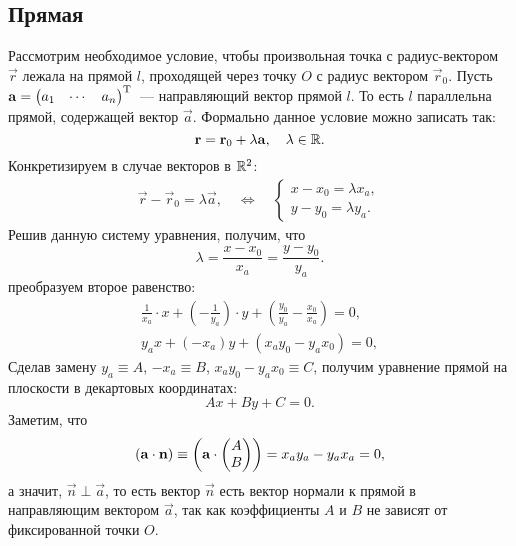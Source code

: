 \subsection{Прямая}

Рассмотрим необходимое условие, чтобы произвольная точка с радиус-вектором $\vec{r}$ лежала на прямой $l$, проходящей через точку $O$ с радиус вектором $\vec{r}_0$. Пусть $ \mathbf{a} = \begin{pmatrix} a_1 & \cdots & a_n\end{pmatrix}^{\operatorname{T}}$~--- направляющий вектор прямой $l$. То есть $l$ параллельна прямой, содержащей вектор $\vec{a}$. Формально данное условие можно записать так:
\begin{equation}
	\mathbf{r} = \mathbf{r}_0 + \lambda \mathbf{a},\quad \lambda \in \mathbb{R}.
\end{equation}
Конкретизируем в случае векторов в $\mathbb{R}^2$:
\begin{gather*}
	\vec{r} - \vec{r}_0 = \lambda \vec{a}, \quad \Longleftrightarrow \quad
	\begin{cases}
		x - x_0 = \lambda x_a,\\
		y - y_0 = \lambda y_a.
	\end{cases}
\end{gather*}
Решив данную систему уравнения, получим, что
\begin{equation*}
	\lambda = \frac{x - x_0}{x_a} = \frac{y - y_0}{y_a}.
\end{equation*}
преобразуем второе равенство:
\begin{gather*}
	\frac{1}{x_a} \cdot x + \left( - \frac{1}{y_a} \right) \cdot y + \left( \frac{y_0}{y_a} - \frac{x_0}{x_a} \right) = 0,\\
	y_a x + (-x_a)y + (x_a y_0 - y_a x_0) = 0,
\end{gather*}
Сделав замену $y_a \equiv A$, $-x_a \equiv B$, $x_a y_0 - y_a x_0 \equiv C$, получим уравнение прямой на плоскости в декартовых координатах:
\begin{equation}
	Ax + By + C = 0.
\end{equation}
Заметим, что
\begin{equation*}
	\left(\mathbf{a} \cdot \mathbf{n}\right) \equiv \left(\mathbf{a} \cdot \mathbf{
	\begin{pmatrix}
		A\\
		B
	\end{pmatrix}}\right) = x_a y_a - y_a x_a = 0,
\end{equation*}
а значит, $\vec{n} \perp \vec{a}$, то есть вектор $\vec{n}$ есть вектор нормали к прямой в направляющим вектором $\vec{a}$, так как коэффициенты $A$ и $B$ не зависят от фиксированной точки $O$.
